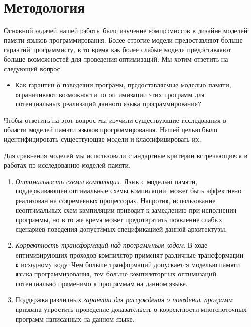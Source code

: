 \section{Методология}
\label{sec:methodology}

Основной задачей нашей работы было изучение
компромиссов в дизайне моделей памяти 
языков программирования. 
Более строгие модели предоставляют больше гарантий программисту,
в то время как более слабые модели предоставляют 
больше возможностей для проведения оптимизаций. 
Мы хотим ответить на следующий вопрос. 

\begin{itemize}
  \item Как гарантии о поведении программ, 
    предоставляемые моделью памяти, ограничивают возможности 
    по оптимизации этих программ для потенциальных реализаций
    данного языка программирования?
\end{itemize}

Чтобы ответить на этот вопрос мы изучили существующие исследования 
в области моделей памяти языков программирования.
Нашей целью было идентифицировать существующие модели и классифицировать их.

Для сравнения моделей мы использовали стандартные критерии
встречающиеся в работах по исследованию моделей памяти. 

\begin{enumerate}[label=\textbf{C.\arabic*}]
  
  \item \label{item:criteria:opt-comp}
    \emph{Оптимальность схемы компиляции.}
    Язык с моделью памяти, поддерживающей оптимальные 
    схемы компиляции, может быть эффективно реализован
    на современных процессорах. 
    Напротив, использование неоптимальных схем компиляции
    приводит к замедлению при исполнении программы, 
    но в то же время может предотвратить появление 
    слабых сценариев поведения допустимых спецификацией данной архитектуры. 

  \item \label{item:criteria:sound-trans}
    \emph{Корректность трансформаций над программным кодом.} 
    В ходе оптимизирующих проходов компилятор
    применят различные трансформации к исходному коду. 
    Чем больше транформаций допускается моделью памяти языка программирования, 
    тем больше компиляторных оптимизаций потенциально применимо 
    к программам на данном языке. 

  \item \label{item:criteria:reasoning}
    Поддержка различных \emph{гарантии для рассуждения о поведении программ}
    призвана упростить проведение доказательств о корректности 
    многопоточных программ написанных на данном языке. 
  
\end{enumerate}

